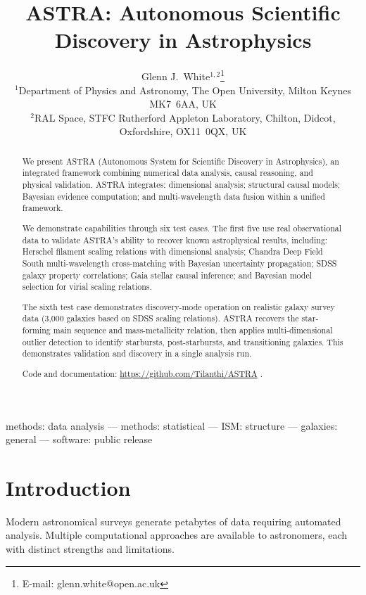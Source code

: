 \documentclass[usenatbib]{rasti}
\title[ASTRA: Autonomous Scientific Discovery in Astrophysics]{ASTRA: Autonomous Scientific Discovery in Astrophysics}
\author[White]{
Glenn J.~White$^{1,2}$\thanks{E-mail: glenn.white@open.ac.uk}\\
$^{1}$Department of Physics and Astronomy, The Open University, Milton Keynes MK7~6AA, UK\\
$^{2}$RAL Space, STFC Rutherford Appleton Laboratory, Chilton, Didcot, Oxfordshire, OX11~0QX, UK
}
\begin{document}

\maketitle

\label{firstpage}

\begin{keywords}
methods: data analysis --- methods: statistical --- ISM: structure --- galaxies: general --- software: public release
\end{keywords}

\begin{abstract}
We present ASTRA (Autonomous System for Scientific Discovery in Astrophysics), an integrated framework combining numerical data analysis, causal reasoning, and physical validation. ASTRA integrates: dimensional analysis; structural causal models; Bayesian evidence computation; and multi-wavelength data fusion within a unified framework.

We demonstrate capabilities through six test cases. The first five use real observational data to validate ASTRA's ability to recover known astrophysical results, including: Herschel filament scaling relations with dimensional analysis; Chandra Deep Field South multi-wavelength cross-matching with Bayesian uncertainty propagation; SDSS galaxy property correlations; Gaia stellar causal inference; and Bayesian model selection for virial scaling relations.

The sixth test case demonstrates discovery-mode operation on realistic galaxy survey data (3,000 galaxies based on SDSS scaling relations). ASTRA recovers the star-forming main sequence and mass-metallicity relation, then applies multi-dimensional outlier detection to identify starbursts, post-starbursts, and transitioning galaxies. This demonstrates validation and discovery in a single analysis run.

Code and documentation: \url{https://github.com/Tilanthi/ASTRA} \cite{astra_github}.
\end{abstract}

\section{Introduction}

Modern astronomical surveys generate petabytes of data requiring automated analysis. Multiple computational approaches are available to astronomers, each with distinct strengths and limitations.
\end{document}

